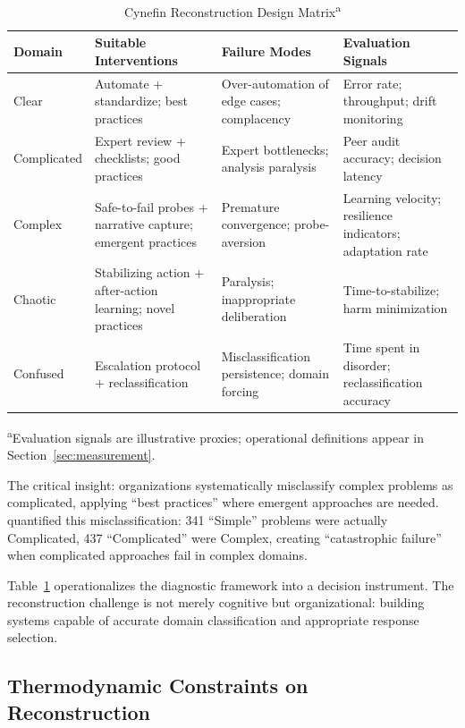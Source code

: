 \begin{table}[htbp]
\centering
\caption{Cynefin Reconstruction Design Matrix\textsuperscript{a}}
\label{tab:cynefin-matrix}
\small
\begin{tabular}{p{2cm}p{3cm}p{3cm}p{3.5cm}}
\hline
\textbf{Domain} & \textbf{Suitable Interventions} & \textbf{Failure Modes} & \textbf{Evaluation Signals} \\
\hline
Clear & Automate + standardize; best practices & Over-automation of edge cases; complacency & Error rate; throughput; drift monitoring \\
\hline
Complicated & Expert review + checklists; good practices & Expert bottlenecks; analysis paralysis & Peer audit accuracy; decision latency \\
\hline
Complex & Safe-to-fail probes + narrative capture; emergent practices & Premature convergence; probe-aversion & Learning velocity; resilience indicators; adaptation rate \\
\hline
Chaotic & Stabilizing action + after-action learning; novel practices & Paralysis; inappropriate deliberation & Time-to-stabilize; harm minimization \\
\hline
Confused & Escalation protocol + reclassification & Misclassification persistence; domain forcing & Time spent in disorder; reclassification accuracy \\
\hline
\end{tabular}

\vspace{0.5em}
{\footnotesize \textsuperscript{a}Evaluation signals are illustrative proxies; operational definitions appear in Section~\ref{sec:measurement}.}
\end{table}

The critical insight: organizations systematically misclassify complex problems as complicated, applying ``best practices'' where emergent approaches are needed. \citet{ford2024} quantified this misclassification: 341 ``Simple'' problems were actually Complicated, 437 ``Complicated'' were Complex, creating ``catastrophic failure'' when complicated approaches fail in complex domains.

Table~\ref{tab:cynefin-matrix} operationalizes the diagnostic framework into a decision instrument. The reconstruction challenge is not merely cognitive but organizational: building systems capable of accurate domain classification and appropriate response selection.

\subsection{Thermodynamic Constraints on Reconstruction}

